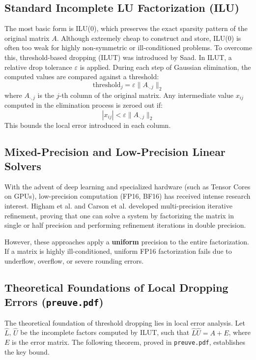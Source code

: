 \documentclass[11pt,a4paper]{article}
\begin{document}
\subsection{Standard Incomplete LU Factorization (ILU)}
The most basic form is ILU(0), which preserves the exact sparsity pattern of the original matrix $A$. Although extremely cheap to construct and store, ILU(0) is often too weak for highly non-symmetric or ill-conditioned problems. To overcome this, threshold-based dropping (ILUT) was introduced by Saad. In ILUT, a relative drop tolerance $\varepsilon$ is applied. During each step of Gaussian elimination, the computed values are compared against a threshold:
\begin{equation}
    \text{threshold}_j = \varepsilon \|A_{\cdot,j}\|_2
\end{equation}
where $A_{\cdot,j}$ is the $j$-th column of the original matrix. Any intermediate value $x_{ij}$ computed in the elimination process is zeroed out if:
\begin{equation}
    |x_{ij}| < \varepsilon \|A_{\cdot,j}\|_2
\end{equation}
This bounds the local error introduced in each column.

\subsection{Mixed-Precision and Low-Precision Linear Solvers}
With the advent of deep learning and specialized hardware (such as Tensor Cores on GPUs), low-precision computation (FP16, BF16) has received intense research interest. Higham et al. and Carson et al. developed multi-precision iterative refinement, proving that one can solve a system by factorizing the matrix in single or half precision and performing refinement iterations in double precision. 

However, these approaches apply a \textbf{uniform} precision to the entire factorization. If a matrix is highly ill-conditioned, uniform FP16 factorization fails due to underflow, overflow, or severe rounding errors. 

\subsection{Theoretical Foundations of Local Dropping Errors (\texttt{preuve.pdf})}%
\label{sec:dropping_bound}

The theoretical foundation of threshold dropping lies in local error analysis. Let $\hat{L}$, $\hat{U}$ be the incomplete factors computed by ILUT, such that $\hat{L}\hat{U} = A + E$, where $E$ is the error matrix. The following theorem, proved in \texttt{preuve.pdf}, establishes the key bound.
\end{document}
